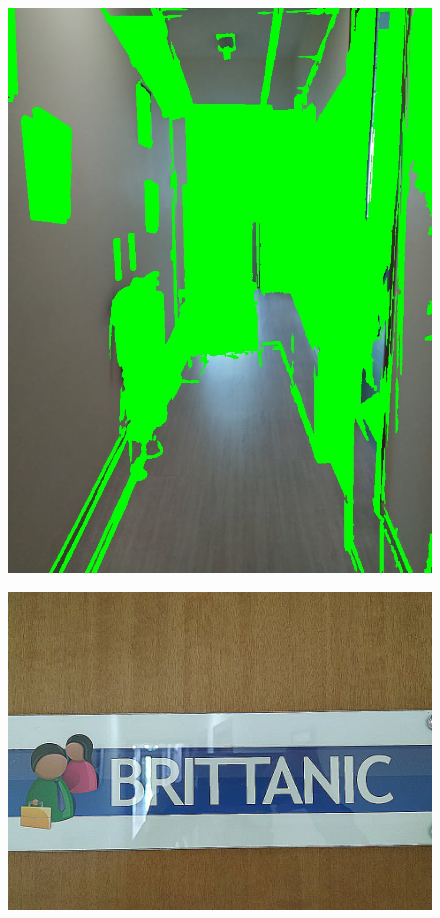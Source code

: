 \documentclass{aifyp}
\begin{document}
\begin{appendices}
\begin{figure}[H]
\begin{minipage}{.5\textwidth}
          \includegraphics[scale=0.2]{Images/Chapter5/filled.jpg}
          \label{fig:test3}
        \end{minipage}%
        \begin{minipage}{.5\textwidth}
          \centering
          \includegraphics[scale=0.2]{Images/Chapter5/brittanicImproved.jpg}
          \label{fig:test4}
        \end{minipage}
    \end{figure}

\end{appendices}
\end{document}
